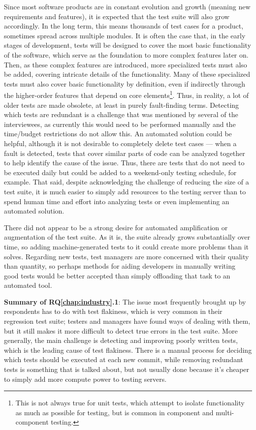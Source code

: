 Since most software products are in constant evolution and growth (meaning new requirements and features), it is expected that the test suite will also grow accordingly.
In the long term, this means thousands of test cases for a product, sometimes spread across multiple modules.
It is often the case that, in the early stages of development, tests will be designed to cover the most basic functionality of the software, which serve as the foundation to more complex features later on.
Then, as these complex features are introduced, more specialized tests must also be added, covering intricate details of the functionality.
Many of these specialized tests must also cover basic functionality by definition, even if indirectly through the higher-order features that depend on core elements\footnote{This is not always true for unit tests, which attempt to isolate functionality as much as possible for testing, but is common in component and multi-component testing.}.
Thus, in reality, a lot of older tests are made obsolete, at least in purely fault-finding terms.
Detecting which tests are redundant is a challenge that was mentioned by several of the interviewees, as currently this would need to be performed manually and the time/budget restrictions do not allow this.
An automated solution could be helpful, although it is not desirable to completely delete test cases — when a fault is detected, tests that cover similar parts of code can be analyzed together to help identify the cause of the issue.
Thus, there are tests that do not need to be executed daily but could be added to a weekend-only testing schedule, for example.
That said, despite acknowledging the challenge of reducing the size of a test suite, it is much easier to simply add resources to the testing server than to spend human time and effort into analyzing tests or even implementing an automated solution.

There did not appear to be a strong desire for automated amplification or augmentation of the test suite.
As it is, the suite already grows substantially over time, so adding machine-generated tests to it could create more problems than it solves.
Regarding new tests, test managers are more concerned with their quality than quantity, so perhaps methods for aiding developers in manually writing good tests would be better accepted than simply offloading that task to an automated tool.

\begin{tcolorbox}%
\textbf{Summary of RQ\ref{chap:industry}.1}: The issue most frequently brought up by respondents has to do with test flakiness, which is very common in their regression test suite; testers and managers have found ways of dealing with them, but it still makes it more difficult to detect true errors in the test suite.
More generally, the main challenge is detecting and improving poorly written tests, which is the leading cause of test flakiness.
There is a manual process for deciding which tests should be executed at each new commit, while removing redundant tests is something that is talked about, but not usually done because it's cheaper to simply add more compute power to testing servers.
\end{tcolorbox}

